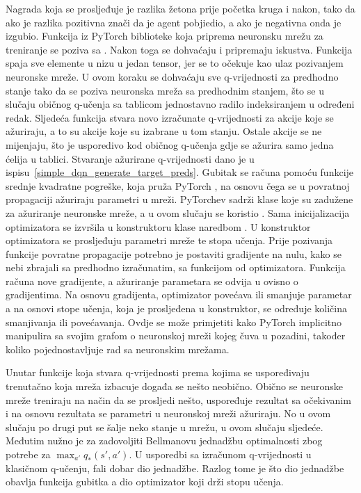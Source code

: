 Nagrada koja se prosljeđuje je razlika žetona prije početka kruga i nakon, tako da ako je razlika pozitivna znači da je agent pobjiedio, a ako je negativna onda je izgubio. Funkcija iz PyTorch biblioteke koja priprema neuronsku mrežu za treniranje se poziva sa . Nakon toga se dohvaćaju i pripremaju iskustva. Funkcija  spaja sve elemente u nizu u jedan tensor, jer se to očekuje kao ulaz pozivanjem neuronske mreže. U ovom koraku se dohvaćaju sve q-vrijednosti za predhodno stanje tako da se poziva neuronska mreža sa predhodnim stanjem, što se u slučaju običnog q-učenja sa tablicom jednostavno radilo indeksiranjem u određeni redak. Sljedeća funkcija  stvara novo izračunate q-vrijednosti za akcije koje se ažuriraju, a to su akcije koje su izabrane u tom stanju. Ostale akcije se ne mijenjaju, što je usporedivo kod običnog q-učenja gdje se ažurira samo jedna ćelija u tablici. Stvaranje ažurirane q-vrijednosti dano je u ispisu~\ref{simple_dqn_generate_target_preds}. Gubitak se računa pomoću funkcije srednje kvadratne pogreške, koja pruža PyTorch , na osnovu čega se u povratnoj propagaciji ažuriraju parametri u mreži. PyTorchev  sadrži klase koje su zadužene za ažuriranje neuronske mreže, a u ovom slučaju se koristio . Sama inicijalizacija optimizatora se izvršila u konstruktoru klase naredbom . U konstruktor optimizatora se prosljeđuju parametri mreže te stopa učenja. Prije pozivanja funkcije povratne propagacije potrebno je postaviti gradijente na nulu, kako se nebi zbrajali sa predhodno izračunatim, sa funkcijom  od optimizatora. Funkcija  računa nove gradijente, a ažuriranje parametara se odvija u  ovisno o gradijentima. Na osnovu gradijenta, optimizator povećava ili smanjuje parametar a na osnovi stope učenja, koja je prosljeđena u konstruktor, se određuje količina smanjivanja ili povećavanja. Ovdje se može primjetiti kako PyTorch implicitno manipulira sa svojim grafom o neuronskoj mreži kojeg čuva u pozadini, također koliko pojednostavljuje rad sa neuronskim mrežama.


Unutar funkcije koja stvara q-vrijednosti prema kojima se uspoređivaju trenutačno koja mreža izbacuje događa se nešto neobično. Obično se neuronske mreže treniraju na način da se prosljedi nešto, uspoređuje rezultat sa očekivanim i na osnovu rezultata se parametri u neuronskoj mreži ažuriraju. No u ovom slučaju po drugi put se šalje neko stanje u mrežu, u ovom slučaju sljedeće. Međutim nužno je za zadovoljiti Bellmanovu jednadžbu optimalnosti zbog potrebe za $\max_{a'}q_*(s', a')$. U usporedbi sa izračunom q-vrijednosti u klasičnom q-učenju, fali dobar dio jednadžbe. Razlog tome je što dio jednadžbe obavlja funkcija gubitka a dio optimizator koji drži stopu učenja.

